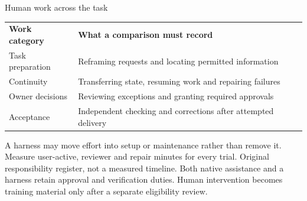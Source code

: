 \begin{frame}[label=effort]{Human work across the task}
\begin{tabular}{p{.28\linewidth}p{.63\linewidth}}
\textbf{Work category} & \textbf{What a comparison must record} \\
Task preparation & Reframing requests and locating permitted information \\
Continuity & Transferring state, resuming work and repairing failures \\
Owner decisions & Reviewing exceptions and granting required approvals \\
Acceptance & Independent checking and corrections after attempted delivery \\
\end{tabular}
\par\medskip
A harness may move effort into setup or maintenance rather than remove it.
Measure user-active, reviewer and repair minutes for every trial.
\vfill
{\footnotesize Original responsibility register, not a measured timeline.
Both native assistance and a harness retain approval and verification duties.
Human intervention becomes training material only after a separate eligibility review.}
\end{frame}
